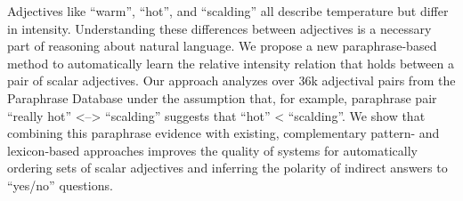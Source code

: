 Adjectives like ``warm'', ``hot'', and ``scalding'' all describe temperature but differ in intensity. Understanding these differences between adjectives is a necessary part of reasoning about natural language. We propose a new paraphrase-based method to automatically learn the relative intensity relation that holds between a pair of scalar adjectives. Our approach analyzes over 36k adjectival pairs from the Paraphrase Database under the assumption that, for example, paraphrase pair ``really hot'' <--> ``scalding'' suggests that ``hot'' < ``scalding''. We show that combining this paraphrase evidence with existing, complementary pattern- and lexicon-based approaches improves the quality of systems for automatically ordering sets of scalar adjectives and inferring the polarity of indirect answers to ``yes/no'' questions.
